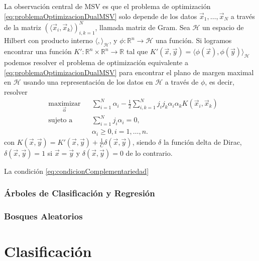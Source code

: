 \documentclass[letterpaper,12pt]{book}
\begin{document}
La observación central de MSV es que el problema de optimización \ref{eq:problemaOptimizacionDualMSV} solo depende de los datos $\vec{x}_1,\dots,\vec{x}_N$ a través de la matriz $\left( \langle\vec{x}_i, \vec{x}_k\rangle \right)_{i,k=1}^N$, llamada matriz de Gram. Sea $\mathcal{H}$ un espacio de Hilbert con producto interno $\langle,\rangle_\mathcal{H}$, y $\phi:\mathbb{R}^n\to\mathcal{H}$ una función. Si logramos encontrar una función $K':\mathbb{R}^n\times\mathbb{R}^n\to\mathbb{R}$ tal que $K'(\vec{x},\vec{y}) = \langle\phi(\vec{x}),\phi(\vec{y})\rangle_{\mathcal{H}}$ podemos resolver el problema de optimización equivalente a \ref{eq:problemaOptimizacionDualMSV} para encontrar el plano de margen maximal en $\mathcal{H}$ usando una representación de los datos en $\mathcal{H}$ a través de $\phi$, es decir, resolver
\begin{equation}\label{eq:problemaOptimizacionDualKernelMSV}
  \begin{aligned}
    & \underset{\vec{\alpha}}{\text{maximizar}}
    & & \sum_{i=1}^N \alpha_i -\frac{1}{2}\sum_{i,k=1}^Nj_ij_k\alpha_i\alpha_k K\left(\vec{x}_i, \vec{x}_k\right)\\
    & \text{sujeto a}
    & & \sum_{i=1}^Nj_i\alpha_i = 0, \\
    & & & \alpha_i \geq 0 , i = 1,\dots,n. 
  \end{aligned}
\end{equation}
con $K(\vec{x},\vec{y}) = K'(\vec{x},\vec{y}) + \frac{1}{C}\delta(\vec{x},\vec{y})$, siendo $\delta$ la función delta de Dirac, $\delta(\vec{x},\vec{y}) = 1$ si $\vec{x}=\vec{y}$ y $\delta(\vec{x},\vec{y})= 0$ de lo contrario.

La condición \ref{eq:condicionComplementariedad}
 

\subsection{Árboles de Clasificación y Regresión}

\subsection{Bosques Aleatorios}

\chapter{Clasificación}\label{cap:clasificacion} 
\end{document}
